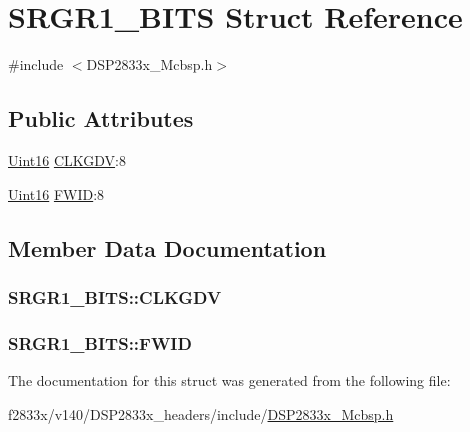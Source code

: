 \hypertarget{struct_s_r_g_r1___b_i_t_s}{}\section{S\+R\+G\+R1\+\_\+\+B\+I\+T\+S Struct Reference}
\label{struct_s_r_g_r1___b_i_t_s}


{\ttfamily \#include $<$D\+S\+P2833x\+\_\+\+Mcbsp.\+h$>$}

\subsection*{Public Attributes}
\begin{DoxyCompactItemize}
\item 
\hyperlink{_d_s_p2833x___device_8h_a59a9f6be4562c327cbfb4f7e8e18f08b}{Uint16} \hyperlink{struct_s_r_g_r1___b_i_t_s_a0294900b9effc99fef7dec8c14d9e82b}{C\+L\+K\+G\+D\+V}\+:8
\item 
\hyperlink{_d_s_p2833x___device_8h_a59a9f6be4562c327cbfb4f7e8e18f08b}{Uint16} \hyperlink{struct_s_r_g_r1___b_i_t_s_a5029f7cf345798ca0eeb11d157046fc3}{F\+W\+I\+D}\+:8
\end{DoxyCompactItemize}


\subsection{Member Data Documentation}
\hypertarget{struct_s_r_g_r1___b_i_t_s_a0294900b9effc99fef7dec8c14d9e82b}{}
\subsubsection[{C\+L\+K\+G\+D\+V}]{ S\+R\+G\+R1\+\_\+\+B\+I\+T\+S\+::\+C\+L\+K\+G\+D\+V}\label{struct_s_r_g_r1___b_i_t_s_a0294900b9effc99fef7dec8c14d9e82b}
\hypertarget{struct_s_r_g_r1___b_i_t_s_a5029f7cf345798ca0eeb11d157046fc3}{}
\subsubsection[{F\+W\+I\+D}]{ S\+R\+G\+R1\+\_\+\+B\+I\+T\+S\+::\+F\+W\+I\+D}\label{struct_s_r_g_r1___b_i_t_s_a5029f7cf345798ca0eeb11d157046fc3}


The documentation for this struct was generated from the following file\+:\begin{DoxyCompactItemize}
\item 
f2833x/v140/\+D\+S\+P2833x\+\_\+headers/include/\hyperlink{_d_s_p2833x___mcbsp_8h}{D\+S\+P2833x\+\_\+\+Mcbsp.\+h}\end{DoxyCompactItemize}
